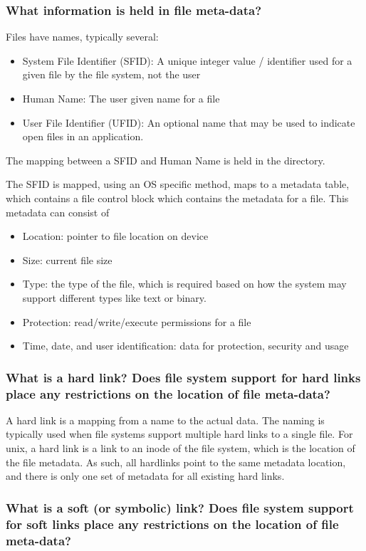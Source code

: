 \documentclass[]{article}
\begin{document}
        \subsubsection{What information is held in file meta-data?}

            Files have names, typically several:

            \begin{itemize}
                \item System File Identifier (SFID): A unique integer value / identifier used for a given file by the file system, not the user
                \item Human Name: The user given name for a file
                \item User File Identifier (UFID): An optional name that may be used to indicate open files in an application.
            \end{itemize}

            The mapping between a SFID and Human Name is held in the directory.

            The SFID is mapped, using an OS specific method, maps to a metadata table, which contains a file control block which contains the metadata for a file. This metadata can consist of

            \begin{itemize}
                \item Location: pointer to file location on device
                \item Size: current file size
                \item Type: the type of the file, which is required based on how the system may support different types like text or binary.
                \item Protection: read/write/execute permissions for a file
                \item   Time, date, and user identification: data for protection, security and usage
            \end{itemize}

        \subsubsection{What is a hard link? Does file system support for hard links place any restrictions on the location of file meta-data?}

            A hard link is a mapping from a name to the actual data. The naming is typically used when file systems support multiple hard links to a single file. For unix, a hard link is a link to an inode of the file system, which is the location of the file metadata. As such, all hardlinks point to the same metadata location, and there is only one set of metadata for all existing hard links.

        \subsubsection{What is a soft (or symbolic) link? Does file system support for soft links place any restrictions on the location of file meta-data?}
\end{document}
